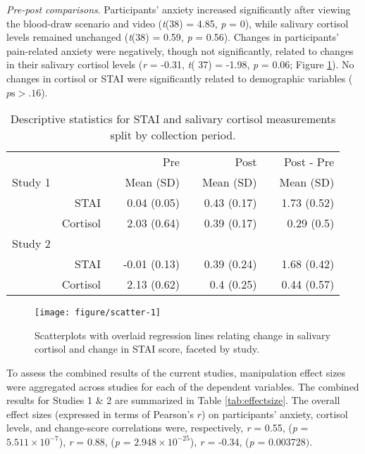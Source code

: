 \documentclass[review]{elsarticle}\usepackage[]{graphicx}\usepackage[]{color}
\makeatletter
\def\maxwidth{ %
  \ifdim\Gin@nat@width>\linewidth
    \linewidth
  \else
    \Gin@nat@width
  \fi
}
\newenvironment{knitrout}{}{} %
\makeatother
\begin{document}
\emph{Pre-post comparisons}. Participants' anxiety increased significantly after viewing the blood-draw scenario and video (\textit{t}(38) = 4.85, \textit{p} = 0), while salivary cortisol levels remained unchanged (\textit{t}(38) = 0.59, \textit{p} = 0.56).
Changes in participants' pain-related anxiety were negatively, though not significantly, related to changes in their salivary cortisol levels (\textit{r} = -0.31, \textit{t}( 37) = -1.98, \textit{p} = 0.06; Figure \ref{fig:scatter}).
No changes in cortisol or STAI were significantly related to demographic variables ($p \mbox{s} > .16$).

\begin{table}[ht]
\centering
\caption{Descriptive statistics for STAI and salivary cortisol measurements split by collection period.}
\begin{tabular}{rrrrrrrr}
\hline
& & & Pre & & Post & & Post - Pre\\ [0.5ex]
Study 1 & & & Mean (SD) & & Mean (SD) & & Mean (SD)\\
\hline
& STAI & & 0.04 (0.05) & & 0.43 (0.17) & & 1.73 (0.52)\\
& Cortisol & & 2.03 (0.64) & & 0.39 (0.17) & & 0.29 (0.5)\\
Study 2 & & & & & & &\\
\hline
& STAI & & -0.01 (0.13) & & 0.39 (0.24) & & 1.68 (0.42)\\
& Cortisol & & 2.13 (0.62) & & 0.4 (0.25) & & 0.44 (0.57)\\
\hline
\end{tabular}
\label{tab:descriptives}
\end{table}

\begin{figure}[ht]
\begin{center}
\caption{Scatterplots with overlaid regression lines relating change in salivary cortisol and change in STAI score, faceted by study.}
\label{fig:scatter}

\begin{knitrout}
\color{fgcolor}
\texttt{[image: figure/scatter-1]} 

\end{knitrout}

\end{center}
\end{figure}

To assess the combined results of the current studies, manipulation effect sizes were aggregated across studies for each of the dependent variables.
The combined results for Studies 1 \& 2 are summarized in Table \ref{tab:effectsize}.
The overall effect sizes (expressed in terms of Pearson's $r$) on participants' anxiety, cortisol levels, and change-score correlations were, respectively, \textit{r} = 0.55, (\textit{p} =  $5.511 \times 10^{-7}$), \textit{r} = 0.88, (\textit{p} = $2.948 \times 10^{-25}$), \textit{r} = -0.34, (\textit{p} = 0.003728$)$.
\end{document}
